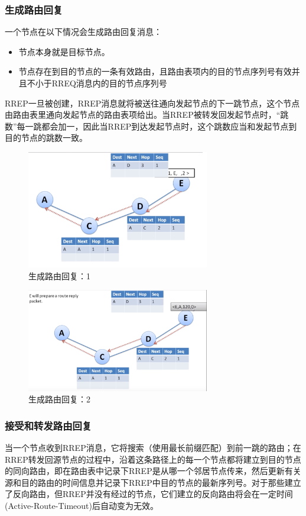 \documentclass[12pt,a4paper]{article}
\begin{document}
\subsubsection{生成路由回复}
一个节点在以下情况会生成路由回复消息：
\begin{itemize}
	\item 节点本身就是目标节点。
	\item 节点存在到目的节点的一条有效路由，且路由表项内的目的节点序列号有效并且不小于RREQ消息内的目的节点序列号
\end{itemize}

RREP一旦被创建，RREP消息就将被送往通向发起节点的下一跳节点，这个节点由路由表里通向发起节点的路由表项给出。当RREP被转发回发起节点时，“跳数”每一跳都会加一，因此当RREP到达发起节点时，这个跳数应当和发起节点到目的节点的跳数一致。

\begin{figure}[htb]
\centering
\includegraphics[width=8cm]{gen_route_reply_1}
\caption{生成路由回复：1}
\end{figure}

\begin{figure}[htb]
\centering
\includegraphics[width=8cm]{gen_route_reply_2}
\caption{生成路由回复：2}
\end{figure}

\subsubsection{接受和转发路由回复}
当一个节点收到RREP消息，它将搜索（使用最长前缀匹配）到前一跳的路由；在RREP转发回源节点的过程中，沿着这条路径上的每一个节点都将建立到目的节点的同向路由，即在路由表中记录下RREP是从哪一个邻居节点传来，然后更新有关源和目的路由的时间信息并记录下RREP中目的节点的最新序列号。对于那些建立了反向路由，但RREP并没有经过的节点，它们建立的反向路由将会在一定时间(Active-Route-Timeout)后自动变为无效。
\end{document}
